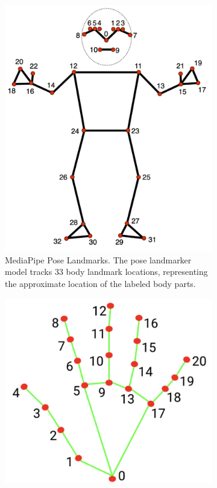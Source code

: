 \documentclass[acmsmall, screen]{acmart}
\begin{document}
\begin{figure}[htbp]
  \centering
  \begin{subfigure}[b]{0.35\linewidth}
    \centering
    \includegraphics[width=\linewidth]{assets/pose-landmarks.png}
    \caption{MediaPipe Pose Landmarks. The pose landmarker model tracks 33 body landmark locations, representing the approximate location of the labeled body parts.}
    \label{fig:pose-landmarks}
  \end{subfigure}%
  \hspace{1em}%
  \begin{subfigure}[b]{0.35\linewidth}
    \centering
    \includegraphics[width=\linewidth]{assets/hand-landmarks.png}

\end{subfigure}
\end{figure}
\end{document}
